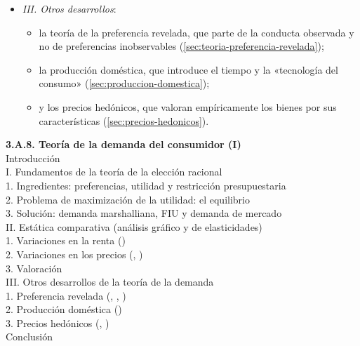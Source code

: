 \documentclass[11pt]{article}
\begin{document}
\begin{itemize}
\begin{itemize}
\begin{itemize}
  \item \emph{III. Otros desarrollos}:
    \begin{itemize}
    \item la teoría de la preferencia revelada, que parte de la conducta observada y no de preferencias inobservables (\ref{sec:teoria-preferencia-revelada});
    \item la producción doméstica, que introduce el tiempo y la «tecnología del consumo» (\ref{sec:produccion-domestica});
    \item y los precios hedónicos, que valoran empíricamente los bienes por sus características (\ref{sec:precios-hedonicos}).
    \end{itemize}
  \end{itemize}
  \end{itemize}
\end{itemize}

\begin{esquema}
\textbf{3.A.8. Teoría de la demanda del consumidor (I)}\\[2pt]
Introducción\\
I. Fundamentos de la teoría de la elección racional\\
\hspace*{1.5em}1. Ingredientes: preferencias, utilidad y restricción presupuestaria\\
\hspace*{1.5em}2. Problema de maximización de la utilidad: el equilibrio\\
\hspace*{1.5em}3. Solución: demanda marshalliana, FIU y demanda de mercado\\
II. Estática comparativa (análisis gráfico y de elasticidades)\\
\hspace*{1.5em}1. Variaciones en la renta ()\\
\hspace*{1.5em}2. Variaciones en los precios (, )\\
\hspace*{1.5em}3. Valoración\\
III. Otros desarrollos de la teoría de la demanda\\
\hspace*{1.5em}1. Preferencia revelada (, , )\\
\hspace*{1.5em}2. Producción doméstica ()\\
\hspace*{1.5em}3. Precios hedónicos (, )\\
Conclusión
\end{esquema}
\end{document}
